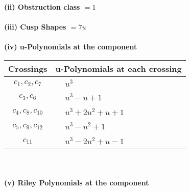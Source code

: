 \documentclass[1p]{elsarticle_modified}
\theoremstyle{definition}
\begin{document}
\flushleft \textbf{(ii) Obstruction class $= 1$}\\~\\
\flushleft \textbf{(iii) Cusp Shapes $= 7 u$}\\~\\
\newpage\renewcommand{\arraystretch}{1}
\flushleft \textbf{(iv) u-Polynomials at the component}\newline \\
\begin{tabular}{m{50pt}|m{274pt}}
Crossings & \hspace{64pt}u-Polynomials at each crossing \\
\hline $$\begin{aligned}c_{1},c_{2},c_{7}\end{aligned}$$&$\begin{aligned}
&u^3
\end{aligned}$\\
\hline $$\begin{aligned}c_{3},c_{6}\end{aligned}$$&$\begin{aligned}
&u^3- u+1
\end{aligned}$\\
\hline $$\begin{aligned}c_{4},c_{8},c_{10}\end{aligned}$$&$\begin{aligned}
&u^3+2 u^2+u+1
\end{aligned}$\\
\hline $$\begin{aligned}c_{5},c_{9},c_{12}\end{aligned}$$&$\begin{aligned}
&u^3- u^2+1
\end{aligned}$\\
\hline $$\begin{aligned}c_{11}\end{aligned}$$&$\begin{aligned}
&u^3-2 u^2+u-1
\end{aligned}$\\
\hline
\end{tabular}\\~\\
\newpage\renewcommand{\arraystretch}{1}
\flushleft \textbf{(v) Riley Polynomials at the component}\newline \\
\end{document}
